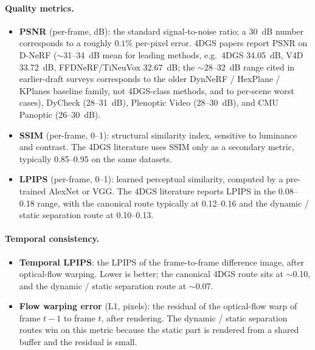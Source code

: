 \paragraph{Quality metrics.}
\begin{itemize}
  \item \textbf{PSNR} (per-frame, dB): the standard
        signal-to-noise ratio; a $30$~dB number corresponds
        to a roughly $0.1$\% per-pixel error. 4DGS papers
        report PSNR on D-NeRF ($\sim$31--34~dB mean for
        leading methods, e.g.\ 4DGS 34.05~dB, V4D 33.72~dB,
        FFDNeRF/TiNeuVox 32.67~dB; the $\sim$28--32~dB
        range cited in earlier-draft surveys corresponds
        to the older DynNeRF / HexPlane / KPlanes baseline
        family, not 4DGS-class methods, and to per-scene
        worst cases), DyCheck (28--31~dB),
        Plenoptic Video (28--30~dB), and CMU Panoptic
        (26--30~dB).
  \item \textbf{SSIM} (per-frame, 0--1): structural similarity
        index, sensitive to luminance and contrast. The 4DGS
        literature uses SSIM only as a secondary metric,
        typically 0.85--0.95 on the same datasets.
  \item \textbf{LPIPS} (per-frame, 0--1): learned perceptual
        similarity, computed by a pre-trained AlexNet or
        VGG. The 4DGS literature reports LPIPS in the
        0.08--0.18 range, with the canonical route
        typically at 0.12--0.16 and the dynamic / static
        separation route at 0.10--0.13.
\end{itemize}

\paragraph{Temporal consistency.}
\begin{itemize}
  \item \textbf{Temporal LPIPS}: the LPIPS of the
        frame-to-frame difference image, after
        optical-flow warping. Lower is better; the
        canonical 4DGS route sits at $\sim$0.10, and the
        dynamic / static separation route at
        $\sim$0.07.
  \item \textbf{Flow warping error} (L1, pixels): the
        residual of the optical-flow warp of frame $t-1$
        to frame $t$, after rendering. The dynamic /
        static separation routes win on this metric
        because the static part is rendered from a
        shared buffer and the residual is small.
\end{itemize}

